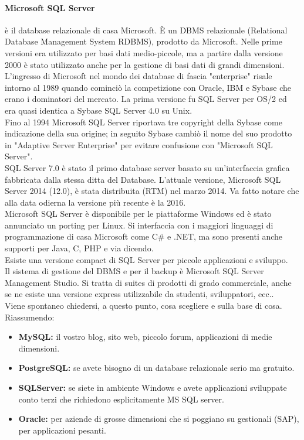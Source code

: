 \documentclass[a4paper]{report}
\begin{document}
\paragraph{Microsoft SQL Server} è il database relazionale di casa Microsoft. È un DBMS relazionale (Relational Database Management
System RDBMS), prodotto da Microsoft. Nelle prime versioni
era utilizzato per basi dati medio-piccole, ma a partire dalla
versione 2000 è stato utilizzato anche per la gestione di basi
dati di grandi dimensioni.\\
L'ingresso di Microsoft nel mondo dei database di fascia "enterprise"
risale intorno al 1989 quando cominciò la competizione con Oracle,
IBM e Sybase che erano i dominatori del mercato. La prima versione
fu SQL Server per OS/2 ed era quasi identica a Sybase SQL Server
4.0 su Unix.\\
Fino al 1994 Microsoft SQL Server riportava tre copyright della
Sybase come indicazione della sua origine; in seguito Sybase cambiò
il nome del suo prodotto in "Adaptive Server Enterprise" per evitare
confusione con "Microsoft SQL Server".\\
SQL Server 7.0 è stato il primo database server basato su
un'interfaccia grafica fabbricata dalla stessa ditta del Database.
L'attuale versione, Microsoft SQL Server 2014 (12.0), è stata
distribuita (RTM) nel marzo 2014. Va fatto notare che alla data odierna la versione più recente è la 2016.\\
Microsoft SQL Server è disponibile per le piattaforme Windows ed è stato annunciato un porting per Linux. Si interfaccia con i maggiori linguaggi di programmazione di casa Microsoft come C\# e .NET, ma sono presenti anche supporti per Java, C, PHP e via dicendo.\\
Esiste una versione compact di SQL Server per piccole applicazioni e sviluppo.\\
Il sistema di gestione del DBMS e per il backup è Microsoft SQL Server Management Studio. Si tratta di suites di prodotti di grado commerciale, anche se ne esiste una versione express utilizzabile da studenti, sviluppatori, ecc..\\
Viene spontaneo chiedersi, a questo punto, cosa scegliere e sulla base di cosa.\\
Riassumendo:
\begin{itemize}
\item \textbf{MySQL:} il vostro blog, sito web, piccolo forum, applicazioni di
medie dimensioni.
\item \textbf{PostgreSQL:} se avete bisogno di un database relazionale serio
ma gratuito.
\item \textbf{SQLServer:} se siete in ambiente Windows e avete applicazioni
sviluppate conto terzi che richiedono esplicitamente MS SQL
server.
\item \textbf{Oracle:} per aziende di grosse dimensioni che si poggiano su
gestionali (SAP), per applicazioni pesanti.
\end{itemize}
\end{document}
